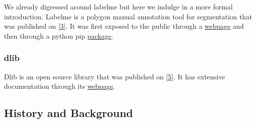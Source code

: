 \documentclass[]{article}
\theoremstyle{definition}
\theoremstyle{definition}
\theoremstyle{definition}
\theoremstyle{remark}
\begin{document}
We already digressed around labelme but here we indulge in a more formal
introduction. Labelme is a polygon manual annotation tool for
segmentation that was published on
{[}\protect\hyperlink{ref-DBLP:journalsux2fcorrux2fabs-1210-3448}{3}{]}.
It was first exposed to the public through a
\href{http://labelme.csail.mit.edu/Release3.0/}{webpage} and then
through a python pip
\href{https://github.com/wkentaro/labelme}{package}.

\hypertarget{dlib}{%
\subsubsection{dlib}\label{dlib}}

Dlib is an open source library that was published on
{[}\protect\hyperlink{ref-King:2009:DML:1577069.1755843}{5}{]}. It has
extensive documentation through its \href{http://dlib.net/}{webpage}.

\hypertarget{history-and-background}{%
\subsection{History and Background}\label{history-and-background}}
\end{document}
